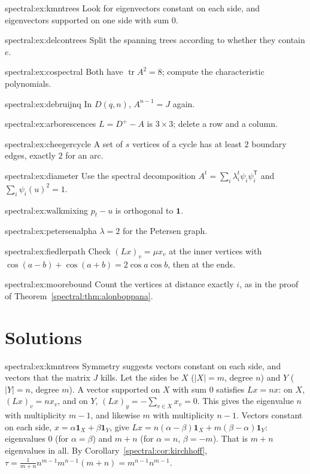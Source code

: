 \begin{hint}{spectral:ex:kmntrees}
Look for eigenvectors constant on each side, and eigenvectors supported on one side with sum $0$.
\end{hint}
\begin{hint}{spectral:ex:delcontrees}
Split the spanning trees according to whether they contain $e$.
\end{hint}
\begin{hint}{spectral:ex:cospectral}
Both have $\operatorname{tr}A^2=8$; compute the characteristic polynomials.
\end{hint}
\begin{hint}{spectral:ex:debruijnq}
In $D(q,n)$, $A^{n-1}=J$ again.
\end{hint}
\begin{hint}{spectral:ex:arborescences}
$L=D^+-A$ is $3\times3$; delete a row and a column.
\end{hint}
\begin{hint}{spectral:ex:cheegercycle}
A set of $s$ vertices of a cycle has at least $2$ boundary edges, exactly $2$ for an arc.
\end{hint}
\begin{hint}{spectral:ex:diameter}
Use the spectral decomposition $A^t=\sum_i\lambda_i^t\psi_i\psi_i^{\mathsf T}$ and $\sum_i\psi_i(u)^2=1$.
\end{hint}
\begin{hint}{spectral:ex:walkmixing}
$p_t-u$ is orthogonal to $\mathbf1$.
\end{hint}
\begin{hint}{spectral:ex:petersenalpha}
$\lambda=2$ for the Petersen graph.
\end{hint}
\begin{hint}{spectral:ex:fiedlerpath}
Check $(Lx)_v=\mu x_v$ at the inner vertices with $\cos(a-b)+\cos(a+b)=2\cos a\cos b$, then at the ends.
\end{hint}
\begin{hint}{spectral:ex:moorebound}
Count the vertices at distance exactly $i$, as in the proof of Theorem~\ref{spectral:thm:alonboppana}.
\end{hint}

\section{Solutions}

\begin{solution}{spectral:ex:kmntrees}
\idea Symmetry suggests vectors constant on each side, and vectors that the matrix $J$ kills.
\writeup Let the sides be $X$ ($|X|=m$, degree $n$) and $Y$ ($|Y|=n$, degree $m$). A vector supported on $X$ with sum $0$ satisfies $Lx=nx$: on $X$, $(Lx)_v=nx_v$, and on $Y$, $(Lx)_y=-\sum_{v\in X}x_v=0$. This gives
the eigenvalue $n$ with multiplicity $m-1$, and likewise $m$ with multiplicity $n-1$. Vectors constant on each side, $x=\alpha\mathbf1_X+\beta\mathbf1_Y$, give $Lx=n(\alpha-\beta)\mathbf1_X+m(\beta-\alpha)\mathbf1_Y$: eigenvalues
$0$ (for $\alpha=\beta$) and $m+n$ (for $\alpha=n$, $\beta=-m$). That is $m+n$ eigenvalues in all. By Corollary~\ref{spectral:cor:kirchhoff}, $\tau=\frac1{m+n}n^{m-1}m^{n-1}(m+n)=m^{n-1}n^{m-1}$.
\end{solution}

